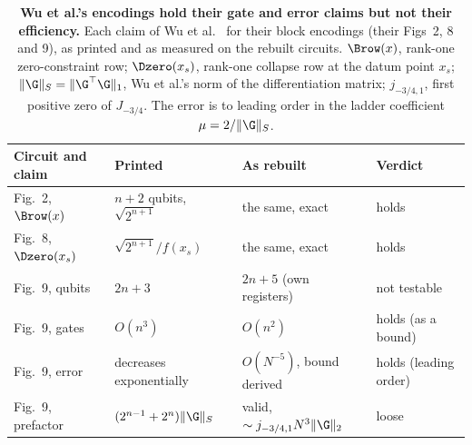 \begin{table}[htbp]
    \centering
    \caption[Wu et al.'s encodings against their printed claims]{\textbf{Wu et al.'s encodings hold their gate and error claims but not their efficiency.} Each claim of Wu et al.\ \cite{wu2025pihm} for their block encodings (their Figs~2, 8 and 9), as printed and as measured on the rebuilt circuits. $\Brow(x)$, rank-one zero-constraint row; $\Dzero(x_s)$, rank-one collapse row at the datum point $x_s$; $\|\G\|_S=\|\G^\top\G\|_1$, Wu et al.'s norm of the differentiation matrix; $j_{-3/4,1}$, first positive zero of $J_{-3/4}$. The error is to leading order in the ladder coefficient $\mu=2/\|\G\|_S$.}
    \label{tab:published-verdicts}
    \small
    \begin{tabular}{@{}l l l l@{}}
        \toprule
        Circuit and claim & Printed & As rebuilt & Verdict \\
        \midrule
        Fig.~2, $\Brow(x)$ & $n+2$ qubits, $\sqrt{2^{n+1}}$ & the same, exact & holds \\
        Fig.~8, $\Dzero(x_s)$ & $\sqrt{2^{n+1}}/f(x_s)$ & the same, exact & holds \\
        Fig.~9, qubits & $2n+3$ & $2n+5$ (own registers) & not testable \\
        Fig.~9, gates & $O(n^3)$ & $O(n^2)$ & holds (as a bound) \\
        Fig.~9, error & decreases exponentially & $O(N^{-5})$, bound derived & holds (leading order) \\
        Fig.~9, prefactor & $(2^{n-1}+2^n)\|\G\|_S$ & valid, $\sim j_{-3/4,1}N^3\|\G\|_2$ & loose \\
        \bottomrule
    \end{tabular}
\end{table}


